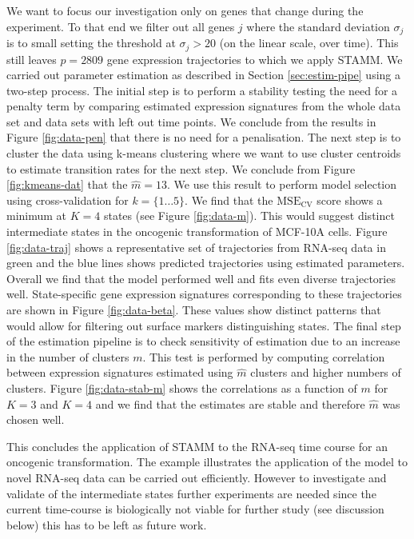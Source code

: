 We want to focus our investigation only on genes that change during the experiment. To that end we filter out all genes $j$ where the standard deviation $\sigma_j$ is to small setting the threshold at $\sigma_j > 20$ (on the linear scale, over time). This still leaves $p=2809$ gene expression trajectories to which we apply STAMM. We carried out parameter estimation as described in Section \ref{sec:estim-pipe} using a two-step process. The initial step is to perform a stability testing the need for a penalty term by comparing estimated expression signatures from the whole data set and data sets with left out time points. We conclude from the results in Figure \ref{fig:data-pen} that there is no need for a penalisation. The next step is to cluster the data using k-means clustering where we want to use cluster centroids to estimate transition rates for the next step. We conclude from Figure \ref{fig:kmeans-dat} that the $\hat{m} = 13$. We use this result to perform model selection using cross-validation for $k=\lbrace 1 \ldots 5\rbrace$. We find that the $\mathrm{MSE_{CV}}$ score shows a minimum at $K=4$ states (see Figure \ref{fig:data-m}). This would suggest distinct intermediate states in the oncogenic transformation of MCF-10A cells. Figure \ref{fig:data-traj} shows a representative set of trajectories from RNA-seq data in green and the blue lines shows predicted trajectories using estimated parameters. Overall we find that the model performed well and fits even diverse trajectories well. State-specific gene expression signatures corresponding to these trajectories are shown in Figure \ref{fig:data-beta}. These values show distinct patterns that would allow for filtering out surface markers distinguishing states. The final step of the estimation pipeline is to check sensitivity of estimation due to an increase in the number of clusters $m$. This test is performed by computing correlation between expression signatures estimated using $\hat{m}$ clusters and higher numbers of clusters. Figure \ref{fig:data-stab-m} shows the correlations as a function of $m$ for $K=3$ and $K=4$ and we find that the estimates are stable and therefore $\hat{m}$ was chosen well.

This concludes the application of STAMM to the RNA-seq time course for an oncogenic transformation. The example illustrates the application of the model to novel RNA-seq data can be carried out efficiently. However to investigate and validate of the intermediate states further experiments are needed since the current time-course is biologically not viable for further study (see discussion below) this has to be left as future work. 

